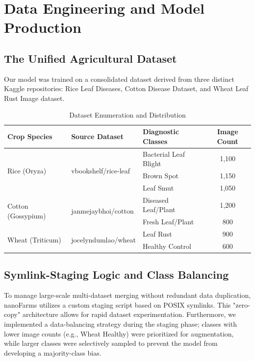 \documentclass[11pt,onecolumn]{article}
\begin{document}
\section{Data Engineering and Model Production}
\subsection{The Unified Agricultural Dataset}
Our model was trained on a consolidated dataset derived from three distinct Kaggle repositories: Rice Leaf Diseases, Cotton Disease Dataset, and Wheat Leaf Rust Image dataset. 

\begin{table}[h]
\centering
\caption{Dataset Enumeration and Distribution}
\begin{tabular}{@{}lllc@{}}
\toprule
\textbf{Crop Species} & \textbf{Source Dataset} & \textbf{Diagnostic Classes} & \textbf{Image Count} \\ \midrule
\multirow{3}{*}{Rice (Oryza)} & \multirow{3}{*}{vbookshelf/rice-leaf} & Bacterial Leaf Blight & 1,100 \\
 &  & Brown Spot & 1,150 \\
 &  & Leaf Smut & 1,050 \\ \midrule
\multirow{2}{*}{Cotton (Gossypium)} & \multirow{2}{*}{janmejaybhoi/cotton} & Diseased Leaf/Plant & 1,200 \\
 &  & Fresh Leaf/Plant & 800 \\ \midrule
\multirow{2}{*}{Wheat (Triticum)} & \multirow{2}{*}{jocelyndumlao/wheat} & Leaf Rust & 900 \\
 &  & Healthy Control & 600 \\ \bottomrule
\end{tabular}
\end{table}

\subsection{Symlink-Staging Logic and Class Balancing}
To manage large-scale multi-dataset merging without redundant data duplication, nanoFarms utilizes a custom staging script based on POSIX symlinks. This "zero-copy" architecture allows for rapid dataset experimentation. Furthermore, we implemented a data-balancing strategy during the staging phase; classes with lower image counts (e.g., Wheat Healthy) were prioritized for augmentation, while larger classes were selectively sampled to prevent the model from developing a majority-class bias.
\end{document}
